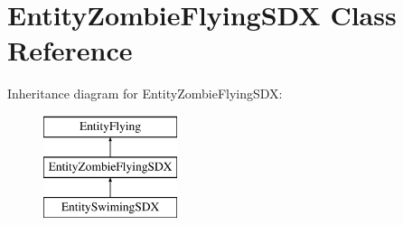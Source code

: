 \hypertarget{class_entity_zombie_flying_s_d_x}{}\section{Entity\+Zombie\+Flying\+S\+DX Class Reference}
\label{class_entity_zombie_flying_s_d_x}
Inheritance diagram for Entity\+Zombie\+Flying\+S\+DX\+:\begin{figure}[H]
\begin{center}
\leavevmode
\includegraphics[height=3.000000cm]{d1/d2b/class_entity_zombie_flying_s_d_x}
\end{center}
\end{figure}
